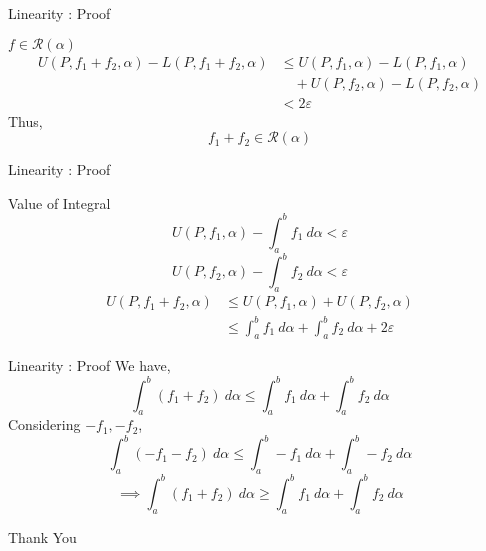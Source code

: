 \documentclass{beamer}
\begin{document}
\begin{frame}{Linearity : Proof}
\begin{block}{$ f \in\mathscr{R}(\alpha)$}
	\begin{align*}
		U(P,f_1+f_2,\alpha) - L(P,f_1+f_2,\alpha) & \le U(P,f_1,\alpha) - L(P,f_1,\alpha)\\
		& \quad + U(P,f_2,\alpha) - L(P,f_2,\alpha) \\
		& < 2\varepsilon
	\end{align*}
	Thus,
	\[ f_1+f_2 \in \mathscr{R}(\alpha) \]
\end{block}
\end{frame}

\begin{frame}{Linearity : Proof}
\begin{block}{Value of Integral}
	\[ U(P,f_1,\alpha) - \int_a^b f_1 \ d\alpha < \varepsilon \]
	\[ U(P,f_2,\alpha) - \int_a^b f_2 \ d\alpha < \varepsilon \]
	\begin{align*}
		U(P,f_1+f_2,\alpha)  
		& \le U(P,f_1,\alpha) + U(P,f_2,\alpha) \\
		& \le \int_a^b f_1 \ d\alpha + \int_a^b f_2\ d\alpha + 2\varepsilon
	\end{align*}
\end{block}
\end{frame}
\begin{frame}{Linearity : Proof}
	We have,
	\[ \int_a^b (f_1+f_2)\ d\alpha \le \int_a^b f_1\ d\alpha + \int_a^b f_2\ d\alpha \]
	Considering $-f_1,-f_2$,
	\[ \int_a^b (-f_1-f_2)\ d\alpha \le \int_a^b -f_1\ d\alpha + \int_a^b -f_2\ d\alpha \]
	\[ \implies \int_a^b (f_1+f_2)\ d\alpha \ge \int_a^b f_1\ d\alpha + \int_a^b f_2\ d\alpha \]
\end{frame}

\begin{frame}
	\vspace{0.6in}
	\hspace{3cm} {\color{blue}\Huge{Thank You}}
\end{frame}
\end{document}
